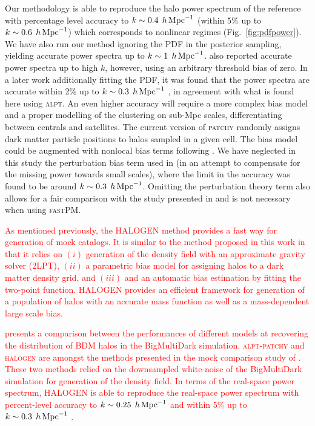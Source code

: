 \documentclass[english,usenatbib]{mn2e}
\newcommand{\tod}[1]{{\textcolor{red}{ #1}}}
\newcommand{\hperm}{\,h\,{\rm Mpc}^{-1}}
\begin{document}
Our methodology is able to reproduce the halo power spectrum of the reference with percentage level accuracy to $k \sim 0.4 \; \hperm$ (within 5\% up to $k \sim 0.6 \; \hperm$) which corresponds to  nonlinear regimes (Fig.~\ref{fig:pdfpower}). We have also run our method ignoring the PDF in the posterior sampling, yielding accurate power spectra up to $k\sim 1 \; \hperm$. \citet[][]{kitaura2014} also reported accurate power spectra up to high $k$, however, using an arbitrary threshold bias of zero. In a later work additionally fitting the PDF, it was found that the power spectra are accurate within 2\% up to $k\sim 0.3 \; \hperm$ \citep[][]{kitaura2015}, in agreement with what is found here using \textsc{alpt}. 
An even higher accuracy will require a more  complex bias model and a proper modelling of the clustering on sub-Mpc scales, differentiating between centrals and satellites. The current version of \textsc{patchy} randomly assigns dark matter particle positions to halos sampled in a given cell.
The bias model could be augmented with nonlocal bias terms following \citet[][]{mcdonald2009}. We have neglected in this study the perturbation bias term used in \citet{kitaura2016} (in an attempt to compensate for the missing power towards small scales), where the limit in the accuracy was found to be around $k\sim 0.3 \; \hperm$. Omitting the perturbation theory term also allows for a fair comparison with the study presented in \citet[][]{kitaura2015} and is not necessary when using \textsc{fastPM}. 

\tod{As mentioned previously, the \textsc{HALOGEN} \citealt{halogen} method provides a fast way for generation of mock catalogs. It is similar to the method proposed in this work in that it relies on $(i)$ generation of the density field with an approximate gravity solver (2LPT), $(ii)$ a parametric bias model for assigning halos to a dark matter density grid, and $(iii)$ and an automatic bias estimation by fitting the two-point function. \textsc{HALOGEN} provides an efficient framework for generation of a population of halos with an accurate mass function as well as a mass-dependent large scale bias.}

\tod{\citet{chuang2015} presents a comparison between the performances of different models at recovering the distribution of BDM halos in the BigMultiDark simulation. \textsc{alpt-patchy} and \textsc{halogen} are amongst the methods presented in the mock comparison study of \citet{chuang2015}. These two methods relied on the downsampled white-noise of the BigMultiDark simulation for generation of the density field. In terms of the real-space power spectrum, \textsc{HALOGEN} is able to reproduce the real-space power spectrum with percent-level accuracy to $k \sim 0.25 \; \hperm$  and within 5\% up to $k \sim 0.3 \; \hperm$ \citep[see real-space lines in the lower panels in Fig.~11 of][]{chuang2015}.}
\end{document}
